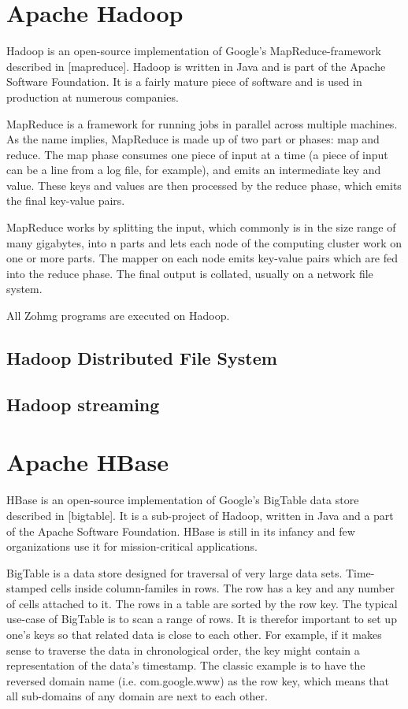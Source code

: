 \documentclass[a4paper,10pt]{book}
\begin{document}
\section{Apache Hadoop}

Hadoop is an open-source implementation of Google's MapReduce-framework described in [mapreduce]. Hadoop is written in Java and is part of the Apache Software Foundation.  It is a fairly mature piece of software and is used in production at numerous companies.

MapReduce is a framework for running jobs in parallel across multiple machines. As the name implies, MapReduce is made up of two part or phases: map and reduce. The map phase consumes one piece of input at a time (a piece of input can be a line from a log file, for example), and emits an intermediate key and value. These keys and values are then processed by the reduce phase, which emits the final key-value pairs.

MapReduce works by splitting the input, which commonly is in the size range of many gigabytes, into n parts and lets each node of the computing cluster work on one or more parts. The mapper on each node emits key-value pairs which are fed into the reduce phase. The final output is collated, usually on a network file system.

All Zohmg programs are executed on Hadoop.

\subsection{Hadoop Distributed File System}

\subsection{Hadoop streaming}

\section{Apache HBase}

HBase is an open-source implementation of Google's BigTable data store described in [bigtable]. It is a sub-project of Hadoop, written in Java and a part of the Apache Software Foundation. HBase is still in its infancy and few organizations use it for mission-critical applications.

BigTable is a data store designed for traversal of very large data sets. Time-stamped cells inside column-familes in rows. The row has a key and any number of cells attached to it. The rows in a table are sorted by the row key. The typical use-case of BigTable is to scan a range of rows. It is therefor important to set up one's keys so that related data is close to each other. For example, if it makes sense to traverse the data in chronological order, the key might contain a representation of the data's timestamp. The classic example is to have the reversed domain name (i.e. com.google.www) as the row key, which means that all sub-domains of any domain are next to each other.
\end{document}
